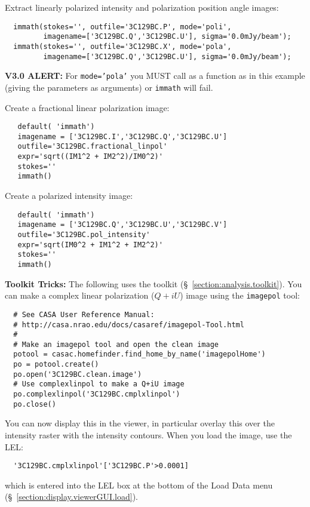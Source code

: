 Extract linearly polarized intensity and polarization position angle images:
\small
\begin{verbatim}
  immath(stokes='', outfile='3C129BC.P', mode='poli', 
         imagename=['3C129BC.Q','3C129BC.U'], sigma='0.0mJy/beam'); 
  immath(stokes='', outfile='3C129BC.X', mode='pola', 
         imagename=['3C129BC.Q','3C129BC.U'], sigma='0.0mJy/beam'); 
\end{verbatim}
\normalsize
{\bf V3.0 ALERT:} For {\tt mode='pola'} you MUST call as a function as
in this example (giving the parameters as arguments) or {\tt immath}
will fail.

Create a fractional linear polarization image:
\small
\begin{verbatim}
   default( 'immath')
   imagename = ['3C129BC.I','3C129BC.Q','3C129BC.U']
   outfile='3C129BC.fractional_linpol'
   expr='sqrt((IM1^2 + IM2^2)/IM0^2)'
   stokes=''
   immath()
\end{verbatim}
\normalsize

Create a polarized intensity image:
\small
\begin{verbatim}
   default( 'immath')
   imagename = ['3C129BC.Q','3C129BC.U','3C129BC.V']
   outfile='3C129BC.pol_intensity'
   expr='sqrt(IM0^2 + IM1^2 + IM2^2)'
   stokes=''
   immath()
\end{verbatim}
\normalsize

{\bf Toolkit Tricks:} The following uses the toolkit 
(\S~\ref{section:analysis.toolkit}).
You can make a complex linear polarization ($Q+iU$) image using the
{\tt imagepol} tool:
\small
\begin{verbatim}
  # See CASA User Reference Manual:
  # http://casa.nrao.edu/docs/casaref/imagepol-Tool.html
  #
  # Make an imagepol tool and open the clean image 
  potool = casac.homefinder.find_home_by_name('imagepolHome')
  po = potool.create()
  po.open('3C129BC.clean.image')
  # Use complexlinpol to make a Q+iU image
  po.complexlinpol('3C129BC.cmplxlinpol')
  po.close()
\end{verbatim}
\normalsize
You can now display this in the viewer, in particular overlay this
over the intensity raster with the intensity contours.  
When you load the image, use the LEL:
\small
\begin{verbatim}
  '3C129BC.cmplxlinpol'['3C129BC.P'>0.0001]
\end{verbatim}
\normalsize
which is entered into the LEL box at the bottom of the Load Data menu
(\S~\ref{section:display.viewerGUI.load}).

